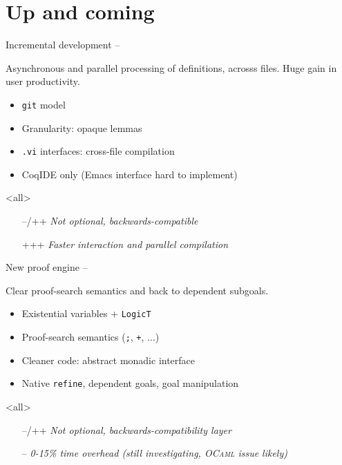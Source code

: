 
\section{Up and coming}
  
\begin{subsecframe}{Incremental development -- }
  \begin{center}
    Asynchronous and parallel processing of definitions, acrosss files. 
    Huge gain in user productivity.
  \end{center}

  \begin{itemize}
  \item \texttt{git} model
  \item Granularity: opaque lemmas
  \item \texttt{.vi} interfaces: cross-file compilation
  \item CoqIDE only (Emacs interface hard to implement)
  \end{itemize}
  \mode<all>

  \begin{itemize}
  \item[--/++] \emph{Not optional, backwards-compatible}
  \item[+++] \emph{Faster interaction and parallel compilation}
  \end{itemize}
\end{subsecframe}

\begin{subsecframe}{New proof engine -- }
  \begin{center}
    Clear proof-search semantics and back to dependent subgoals.
  \end{center}
  
  \begin{itemize}
  \item Existential variables + \texttt{LogicT}
  \item Proof-search semantics (\texttt{;}, \texttt{+}, $\ldots$)
  \item Cleaner code: abstract monadic interface
  \item Native \texttt{refine}, dependent goals, goal manipulation
  \end{itemize}
  \mode<all>

  \begin{itemize}
  \item[--/++] \emph{Not optional, backwards-compatibility layer}
  \item[--] \emph{0-15\% time overhead (still investigating, \textsc{OCaml} issue likely)}
  \end{itemize}
\end{subsecframe}

